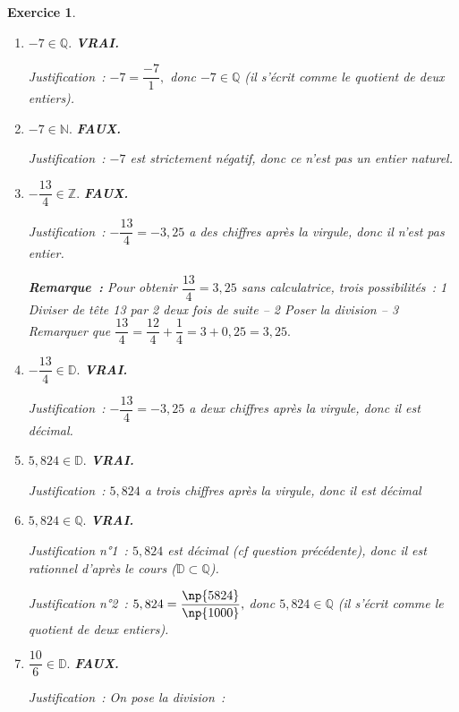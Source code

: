 \documentclass[10pt]{article}
\newtheorem{exo}{Exercice}
\begin{document}
\begin{exo}

\begin{enumerate}
\item $-7\in\mathbb{Q}.$ \textbf{VRAI.}

Justification~: $-7=\dfrac{-7}{1},$ donc $-7\in \mathbb{Q}$ (il s'écrit comme le quotient de deux entiers).

\item $-7\in\mathbb{N}.$ \textbf{FAUX.}

Justification~: $-7$ est strictement négatif, donc ce n'est pas un entier naturel.

\item $-\dfrac{13}{4}\in\mathbb{Z}.$  \textbf{FAUX.}

Justification~: $-\dfrac{13}{4}=-3,25$ a des chiffres après la virgule, donc il n'est pas entier.

\textbf{Remarque~:} Pour obtenir $\dfrac{13}{4}=3,25$ sans calculatrice, trois possibilités~: \textcircled{\small{1}} Diviser de tête 13 par 2 deux fois de suite -- \textcircled{\small{2}} Poser la division -- \textcircled{\small{3}} Remarquer que $\dfrac{13}{4}=\dfrac{12}{4}+\dfrac{1}{4}=3+0,25=3,25.$

\item $-\dfrac{13}{4}\in\mathbb{D}.$  \textbf{VRAI.}

Justification~: $-\dfrac{13}{4}=-3,25$ a deux chiffres après la virgule, donc il est décimal.
\item $5,824\in\mathbb{D}.$ \textbf{VRAI.}

Justification~: $5,824$ a trois chiffres après la virgule, donc il est décimal

\item $5,824\in\mathbb{Q}.$ \textbf{VRAI.}

Justification n°1~: $5,824$ est décimal (cf question précédente), donc il est rationnel d'après le cours ($\mathbb{D}\subset \mathbb{Q}$).

Justification n°2~: $5,824=\dfrac{\np{5824}}{\np{1000}},$ donc $5,824\in \mathbb{Q}$ (il s'écrit comme le quotient de deux entiers).
\item $\dfrac{10}{6}\in\mathbb{D}.$ \textbf{FAUX.}

Justification~: On pose la division~:

\begin{center}
\end{center}


\end{enumerate}
\end{exo}
\end{document}
